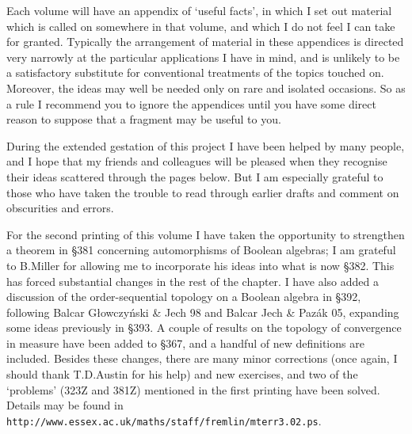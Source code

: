Each volume will have an appendix of `useful facts', in which I set
out material which is called on somewhere in that volume, and which I do
not feel I can take for granted.   Typically the arrangement of material
in these appendices is directed very narrowly at the particular
applications I have in mind, and is unlikely to be a satisfactory
substitute for conventional treatments of the topics touched on.
Moreover, the ideas may well be needed only on rare and isolated
occasions.   So as a rule I
recommend you to ignore the appendices until you have some
direct reason to suppose that a fragment may be useful to you.

During the extended gestation of this project I have been helped by many
people, and I hope that my friends and colleagues will be pleased when
they recognise their ideas scattered through the pages below.   But I am
especially grateful to those who have taken the trouble to read through
earlier drafts and comment on obscurities and errors.



\medskip



\bigskip


\medskip

For the second printing of this volume I have taken the opportunity to 
strengthen a theorem in \S381 concerning automorphisms of Boolean 
algebras;  I am grateful to B.Miller for allowing me to
incorporate his ideas into what is now \S382.   
This has forced substantial changes in the rest of the chapter.   
I have also added a discussion of the
order-sequential topology on a Boolean algebra in \S392, following
{\smc Balcar G{\l}owczy\'nski \& Jech 98}
and {\smc Balcar Jech \& Paz\'ak 05}, 
expanding some ideas previously in \S393.   
A couple of results on the topology of convergence in measure have been 
added to \S367, and a handful of new
definitions are included.   Besides these changes,
there are many minor corrections 
(once again, I should thank T.D.Austin for his help) and new exercises, 
and two of the `problems' (323Z and 381Z) mentioned in the first printing 
have been solved.   Details may be found in 
{\tt http://www.essex.ac.uk/maths/staff/fremlin/mterr3.02.ps}.

